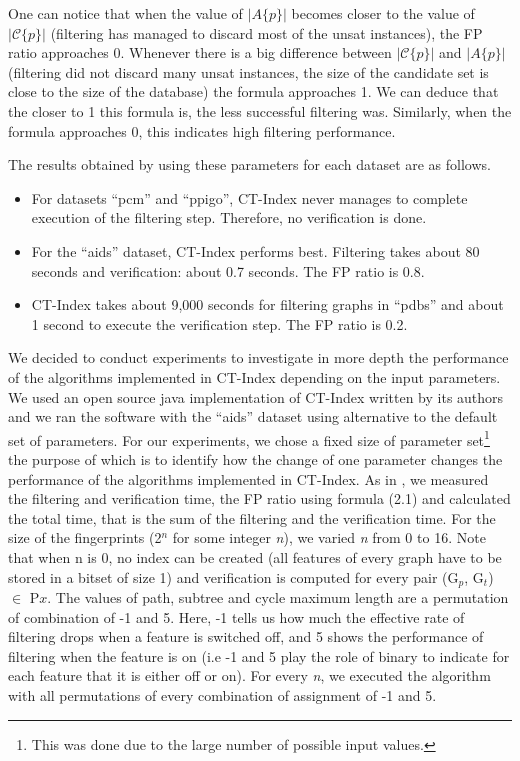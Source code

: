 \documentclass{l4proj}
\newcommand{\fancyC}{\mathcal{C}}
\begin{document}
One can notice that when the value of \textit{$|A\{p\}|$} becomes closer to the value of \textit{$|\fancyC\{p\}|$} (filtering has managed to discard most of the \gls{unsat} instances), the FP ratio approaches 0. Whenever there is a big difference between \textit{$|\fancyC\{p\}|$} and \textit{$|A\{p\}|$} (filtering did not discard many \gls{unsat} instances, the size of the candidate set is close to the size of the database)  the formula approaches 1. We can deduce that the closer to 1 this formula is, the less successful filtering was. Similarly, when the formula approaches 0, this indicates high filtering performance.
 
The results obtained by \cite{foteini} using these parameters for each dataset are as follows.
\begin{itemize}
\item For datasets ``pcm'' and ``ppigo'', CT-Index never manages to complete execution of the filtering step. Therefore, no verification is done.
\item For the ``aids'' dataset, CT-Index performs best. Filtering takes about 80 seconds and verification: about 0.7 seconds. The FP ratio is 0.8.
\item CT-Index takes about 9,000 seconds for filtering graphs in ``pdbs'' and about 1 second to execute the verification step. The FP ratio is 0.2.
\end{itemize}

We decided to conduct experiments to investigate in more depth the performance of the algorithms implemented in CT-Index depending on the input parameters. We used an open source java implementation of CT-Index written by its authors and we ran the software with the ``aids'' dataset using alternative to the default set of parameters. For our experiments, we chose a fixed size of parameter set\footnote{This was done due to the large number of possible input values.} the purpose of which is to identify how the change of one parameter changes the performance of the algorithms implemented in CT-Index. As in \cite{foteini}, we measured the filtering and verification time, the FP ratio using formula (2.1) and calculated the total time, that is the sum of the filtering and the verification time. For the size of the fingerprints (2$^{n}$ for some integer \textit{n}), we varied \textit{n} from 0 to 16. Note that when n is 0, no index can be created (all features of every graph have to be stored in a bitset of size 1) and verification is computed for every pair (G$_{p}$, G$_{t}$) $\in$ P$x$. The values of path, subtree and cycle maximum length are a permutation of combination of -1 and 5. Here, -1 tells us how much the effective rate of filtering drops when a feature is switched off, and 5 shows the performance of filtering when the feature is on (i.e -1 and 5 play the role of binary to indicate for each feature that it is either off or on). For every \textit{n}, we executed the algorithm with all permutations of every combination of assignment of -1 and 5.
\end{document}
